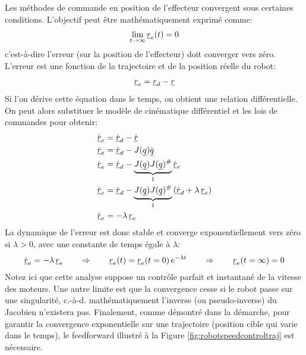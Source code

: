 Les méthodes de commande en position de l'effecteur convergent sous certaines conditions. L'objectif peut être mathématiquement exprimé comme:
\begin{align}
	\lim_{t \rightarrow \infty } \underline{r}_e(t) = 0
\end{align}
c'est-à-dire l'erreur (sur la position de l'effecteur) doit converger vers zéro. L'erreur est une fonction de la trajectoire et de la position réelle du robot:
\begin{align}
	\underline{r}_e = \underline{r}_d - \underline{r}
\end{align}
Si l'on dérive cette équation dans le temps, on obtient une relation différentielle. On peut alors substituer le modèle de cinématique différentiel et les lois de commandes pour obtenir:
\begin{align}
	\dot{\underline{r}}_e  &= \dot{\underline{r}}_d - \dot{\underline{r}} \\
	\dot{\underline{r}}_e  &= \dot{\underline{r}}_d - J(\underline{q}) \dot{\underline{q}} \\
	\dot{\underline{r}}_e  &= \dot{\underline{r}}_d - \underbrace{J(\underline{q}) J(\underline{q})^{\#} }_{1} \dot{\underline{r}}_r \\
	\dot{\underline{r}}_e  &= \dot{\underline{r}}_d - \underbrace{J(\underline{q}) J(\underline{q})^{\#} }_{1}  \left( \dot{\underline{r}}_d + \lambda \, \underline{r}_e \right) \\
	\dot{\underline{r}}_e  &= - \lambda \, \underline{r}_e
\end{align}
La dynamique de l'erreur est donc stable et converge exponentiellement vers zéro si $\lambda>0$, avec une constante de temps égale à $\lambda$:
\begin{align}
	\dot{\underline{r}}_e = - \lambda \, \underline{r}_e
	\quad\quad \Rightarrow \quad\quad
	\underline{r}_e(t) = \underline{r}_e(t=0) \, e^{- \lambda t}
	\quad\quad \Rightarrow \quad\quad
	\underline{r}_e(t=\infty) = 0
\end{align}
Notez ici que cette analyse suppose un contrôle parfait et instantané de la vitesse des moteurs. Une autre limite est que la convergence cesse si le robot passe sur une singularité, c.-à-d. mathématiquement l'inverse (ou pseudo-inverse) du Jacobien n'existera pas. Finalement, comme démontré dans la démarche, pour garantir la convergence exponentielle sur une trajectoire (position cible qui varie dans le temps), le feedforward illustré à la Figure \ref{fig:robotspeedcontroltraj} est nécessaire.



